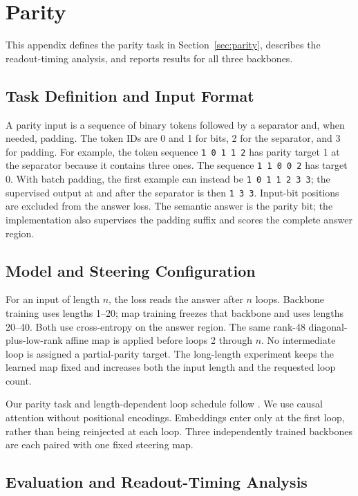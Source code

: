 \documentclass{article}
\begin{document}
\section{Parity}
\label{app:parity}
This appendix defines the parity task in Section~\ref{sec:parity}, describes the readout-timing analysis, and reports results for all three backbones.

\subsection{Task Definition and Input Format}
A parity input is a sequence of binary tokens followed by a separator and, when needed, padding. The token IDs are 0 and 1 for bits, 2 for the separator, and 3 for padding. For example, the token sequence \texttt{1 0 1 1 2} has parity target 1 at the separator because it contains three ones. The sequence \texttt{1 1 0 0 2} has target 0. With batch padding, the first example can instead be \texttt{1 0 1 1 2 3 3}; the supervised output at and after the separator is then \texttt{1 3 3}. Input-bit positions are excluded from the answer loss. The semantic answer is the parity bit; the implementation also supervises the padding suffix and scores the complete answer region.

\subsection{Model and Steering Configuration}
For an input of length $n$, the loss reads the answer after $n$ loops. Backbone training uses lengths 1--20; map training freezes that backbone and uses lengths 20--40. Both use cross-entropy on the answer region. The same rank-48 diagonal-plus-low-rank affine map is applied before loops 2 through $n$. No intermediate loop is assigned a partial-parity target. The long-length experiment keeps the learned map fixed and increases both the input length and the requested loop count.

Our parity task and length-dependent loop schedule follow \citet{fan2025looped}. We use causal attention without positional encodings. Embeddings enter only at the first loop, rather than being reinjected at each loop. Three independently trained backbones are each paired with one fixed steering map.

\subsection{Evaluation and Readout-Timing Analysis}
\label{app:parity-evaluation}
\end{document}
